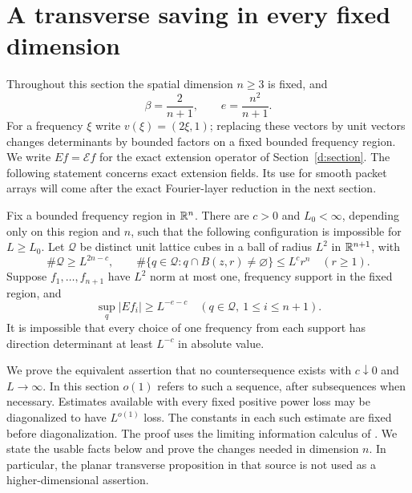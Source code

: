 \section{A transverse saving in every fixed dimension}
\label{t:section}

Throughout this section the spatial dimension $n\ge3$ is fixed, and
\[
 \beta=\frac{2}{n+1},\qquad e=\frac{n^2}{n+1}.
\]
For a frequency $\xi$ write $v(\xi)=(2\xi,1)$; replacing these
vectors by unit vectors changes determinants by bounded factors on
a fixed bounded frequency region.  We write $Ef=\mathcal E f$ for the
exact extension operator of Section~\ref{d:section}.  The following statement concerns
exact extension fields.  Its use for smooth packet arrays will come
after the exact Fourier-layer reduction in the next section.

\begin{proposition}\label{t:transverse}
Fix a bounded frequency region in $\mathbb R^n$.  There are $c>0$ and
$L_0<\infty$, depending only on this region and $n$, such that the
following configuration is impossible for $L\ge L_0$.  Let
$\mathcal Q$ be distinct unit lattice cubes in a ball of radius $L^2$
in $\mathbb R^{n+1}$, with
\begin{equation}\label{t:forbidden-counts}
 \#\mathcal Q\ge L^{2n-c},\qquad
 \#\{q\in\mathcal Q:q\cap B(z,r)\ne\varnothing\}
       \le L^c r^n\quad(r\ge1).
\end{equation}
Suppose $f_1,\ldots,f_{n+1}$ have $L^2$ norm at most one, frequency
support in the fixed region, and
\[
 \sup_q|Ef_i|\ge L^{-e-c}
       \quad(q\in\mathcal Q,\ 1\le i\le n+1).
\]
It is impossible that every choice of one frequency from each support
has direction determinant at least $L^{-c}$ in absolute value.
\end{proposition}

We prove the equivalent assertion that no countersequence exists with
$c\downarrow0$ and $L\to\infty$.  In this section $o(1)$ refers to
such a sequence, after subsequences when necessary.  Estimates available
with every fixed positive power loss may be diagonalized to have
$L^{o(1)}$ loss.  The constants in each such estimate are fixed before
diagonalization.  The proof uses the limiting information calculus of
\citet[Section~3, ``Limiting information calculus'']{PSE2026}.  We state
the usable facts below and prove the changes needed in dimension $n$.
In particular, the planar transverse proposition in that source is not
used as a higher-dimensional assertion.

